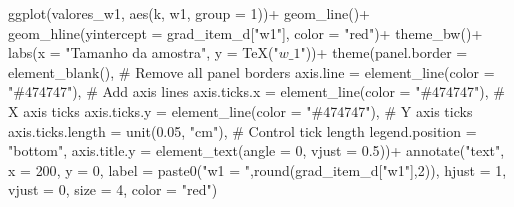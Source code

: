 \documentclass[
  a4paperpaper,
]{article}
\newenvironment{Shaded}{\begin{snugshade}}{\end{snugshade}}
\newcommand{\AttributeTok}[1]{\textcolor[rgb]{0.40,0.45,0.13}{#1}}
\newcommand{\CommentTok}[1]{\textcolor[rgb]{0.37,0.37,0.37}{#1}}
\newcommand{\DecValTok}[1]{\textcolor[rgb]{0.68,0.00,0.00}{#1}}
\newcommand{\FloatTok}[1]{\textcolor[rgb]{0.68,0.00,0.00}{#1}}
\newcommand{\FunctionTok}[1]{\textcolor[rgb]{0.28,0.35,0.67}{#1}}
\newcommand{\NormalTok}[1]{\textcolor[rgb]{0.00,0.23,0.31}{#1}}
\newcommand{\SpecialCharTok}[1]{\textcolor[rgb]{0.37,0.37,0.37}{#1}}
\newcommand{\StringTok}[1]{\textcolor[rgb]{0.13,0.47,0.30}{#1}}
\begin{document}
\begin{Shaded}
\begin{Highlighting}[]
\FunctionTok{ggplot}\NormalTok{(valores\_w1, }\FunctionTok{aes}\NormalTok{(k, w1, }\AttributeTok{group =} \DecValTok{1}\NormalTok{))}\SpecialCharTok{+}
  \FunctionTok{geom\_line}\NormalTok{()}\SpecialCharTok{+}
  \FunctionTok{geom\_hline}\NormalTok{(}\AttributeTok{yintercept =}\NormalTok{ grad\_item\_d[}\StringTok{"w1"}\NormalTok{], }\AttributeTok{color =} \StringTok{"red"}\NormalTok{)}\SpecialCharTok{+}
  \FunctionTok{theme\_bw}\NormalTok{()}\SpecialCharTok{+}
  \FunctionTok{labs}\NormalTok{(}\AttributeTok{x =} \StringTok{"Tamanho da amostra"}\NormalTok{, }\AttributeTok{y =} \FunctionTok{TeX}\NormalTok{(}\StringTok{"$w\_1$"}\NormalTok{))}\SpecialCharTok{+}
  \FunctionTok{theme}\NormalTok{(}\AttributeTok{panel.border =} \FunctionTok{element\_blank}\NormalTok{(), }\CommentTok{\# Remove all panel borders}
    \AttributeTok{axis.line =} \FunctionTok{element\_line}\NormalTok{(}\AttributeTok{color =} \StringTok{"\#474747"}\NormalTok{), }\CommentTok{\# Add axis lines}
    \AttributeTok{axis.ticks.x =} \FunctionTok{element\_line}\NormalTok{(}\AttributeTok{color =} \StringTok{"\#474747"}\NormalTok{), }\CommentTok{\# X axis ticks}
    \AttributeTok{axis.ticks.y =} \FunctionTok{element\_line}\NormalTok{(}\AttributeTok{color =} \StringTok{"\#474747"}\NormalTok{), }\CommentTok{\# Y axis ticks}
    \AttributeTok{axis.ticks.length =} \FunctionTok{unit}\NormalTok{(}\FloatTok{0.05}\NormalTok{, }\StringTok{"cm"}\NormalTok{), }\CommentTok{\# Control tick length}
    \AttributeTok{legend.position =} \StringTok{"bottom"}\NormalTok{,}
    \AttributeTok{axis.title.y =} \FunctionTok{element\_text}\NormalTok{(}\AttributeTok{angle =} \DecValTok{0}\NormalTok{, }\AttributeTok{vjust =} \FloatTok{0.5}\NormalTok{))}\SpecialCharTok{+}
    \FunctionTok{annotate}\NormalTok{(}\StringTok{"text"}\NormalTok{, }\AttributeTok{x =} \DecValTok{200}\NormalTok{, }\AttributeTok{y =} \DecValTok{0}\NormalTok{, }
           \AttributeTok{label =} \FunctionTok{paste0}\NormalTok{(}\StringTok{"w1 = "}\NormalTok{,}\FunctionTok{round}\NormalTok{(grad\_item\_d[}\StringTok{"w1"}\NormalTok{],}\DecValTok{2}\NormalTok{)), }
           \AttributeTok{hjust =} \DecValTok{1}\NormalTok{, }\AttributeTok{vjust =} \DecValTok{0}\NormalTok{, }\AttributeTok{size =} \DecValTok{4}\NormalTok{, }\AttributeTok{color =} \StringTok{"red"}\NormalTok{)}
\end{Highlighting}
\end{Shaded}
\end{document}

